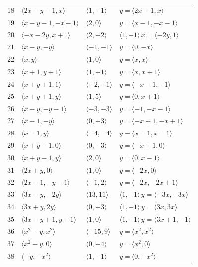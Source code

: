 \documentclass[11pt]{article}
\begin{document}
\begin{longtable}{@{}rlll@{}}
18 & $\langle 2x-y-1,x\rangle$ & $\langle 1,-1\rangle$ & $y=\langle 2x-1,x\rangle$\\
19 & $\langle x-y-1,-x-1\rangle$ & $\langle 2,0\rangle$ & $y=\langle x-1,-x-1\rangle$\\
20 & $\langle -x-2y,x+1\rangle$ & $\langle 2,-2\rangle$ & $\langle 1,-1\rangle\,x=\langle -2y,1\rangle$\\
21 & $\langle x-y,-y\rangle$ & $\langle -1,-1\rangle$ & $y=\langle 0,-x\rangle$\\
22 & $\langle x,y\rangle$ & $\langle 1,0\rangle$ & $y=\langle x,x\rangle$\\
23 & $\langle x+1,y+1\rangle$ & $\langle 1,-1\rangle$ & $y=\langle x,x+1\rangle$\\
24 & $\langle x+y+1,1\rangle$ & $\langle -2,-1\rangle$ & $y=\langle -x-1,-1\rangle$\\
25 & $\langle x+y+1,y\rangle$ & $\langle 1,5\rangle$ & $y=\langle 0,x+1\rangle$\\
26 & $\langle x-y,-y-1\rangle$ & $\langle -3,-3\rangle$ & $y=\langle -1,-x-1\rangle$\\
27 & $\langle x-1,-y\rangle$ & $\langle 0,-3\rangle$ & $y=\langle -x+1,-x+1\rangle$\\
28 & $\langle x-1,y\rangle$ & $\langle -4,-4\rangle$ & $y=\langle x-1,x-1\rangle$\\
29 & $\langle x+y-1,0\rangle$ & $\langle 0,-3\rangle$ & $y=\langle -x+1,0\rangle$\\
30 & $\langle x+y-1,y\rangle$ & $\langle 2,0\rangle$ & $y=\langle 0,x-1\rangle$\\
31 & $\langle 2x+y,0\rangle$ & $\langle 1,0\rangle$ & $y=\langle -2x,0\rangle$\\
32 & $\langle 2x-1,-y-1\rangle$ & $\langle -1,2\rangle$ & $y=\langle -2x,-2x+1\rangle$\\
33 & $\langle 3x-y,-2y\rangle$ & $\langle 13,11\rangle$ & $\langle 1,-1\rangle\,y=\langle -3x,-3x\rangle$\\
34 & $\langle 3x+y,2y\rangle$ & $\langle 0,-3\rangle$ & $\langle 1,-1\rangle\,y=\langle 3x,3x\rangle$\\
35 & $\langle 3x-y+1,y-1\rangle$ & $\langle 1,0\rangle$ & $\langle 1,-1\rangle\,y=\langle 3x+1,-1\rangle$\\
36 & $\langle x^{2}-y,x^{2}\rangle$ & $\langle -15,9\rangle$ & $y=\langle x^{2},x^{2}\rangle$\\
37 & $\langle x^{2}-y,0\rangle$ & $\langle 0,-4\rangle$ & $y=\langle x^{2},0\rangle$\\
38 & $\langle -y,-x^{2}\rangle$ & $\langle 1,-1\rangle$ & $y=\langle 0,-x^{2}\rangle$\\

\end{longtable}
\end{document}
